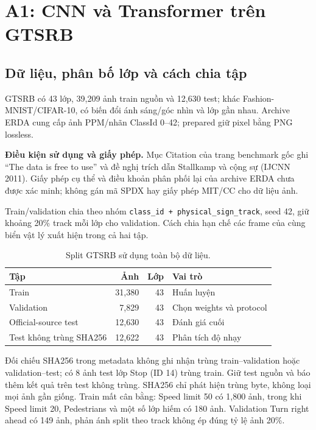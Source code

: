 \chapter{A1: CNN và Transformer trên GTSRB}
\section{Dữ liệu, phân bố lớp và cách chia tập}
GTSRB \cite{gtsrb,gtsrb2011} có 43 lớp, 39,209 ảnh train nguồn và 12,630 test;
khác Fashion-MNIST/CIFAR-10, có biến đổi ánh sáng/góc nhìn và lớp gần nhau.
Archive ERDA \cite{gtsrbarchive} cung cấp ảnh PPM/nhãn ClassId 0--42;
prepared giữ pixel bằng PNG lossless.

\textbf{Điều kiện sử dụng và giấy phép.} Mục Citation của trang benchmark gốc
\cite{gtsrbterms} ghi ``The data is free to use'' và đề nghị trích dẫn
Stallkamp và cộng sự (IJCNN 2011). Giấy phép cụ thể và điều khoản phân phối
lại của archive ERDA chưa được xác minh; không gán mã SPDX hay giấy phép
MIT/CC cho dữ liệu ảnh.

Train/validation chia theo nhóm \texttt{class\_id + physical\_sign\_track},
seed 42, giữ khoảng 20\% track mỗi lớp cho validation. Cách chia hạn chế
các frame của cùng biển vật lý xuất hiện trong cả hai tập.
\begin{table}[H]\centering\caption{Split GTSRB sử dụng toàn bộ dữ liệu.}
\begin{tabular}{lrrl}\toprule Tập & Ảnh & Lớp & Vai trò\\\midrule
Train &31,380&43&Huấn luyện\\
Validation &7,829&43&Chọn weights và protocol\\
Official-source test &12,630&43&Đánh giá cuối\\
Test không trùng SHA256 &12,622&43&Phân tích độ nhạy\\\bottomrule\end{tabular}\label{table:a1-1}
\end{table}
Đối chiếu SHA256 trong metadata không ghi nhận trùng train--validation
hoặc validation--test; có 8 ảnh test lớp Stop (ID 14) trùng train.
Giữ test nguồn và báo thêm kết quả trên test không trùng. SHA256 chỉ
phát hiện trùng byte, không loại mọi ảnh gần giống.
Train mất cân bằng: Speed limit 50 có 1,800 ảnh, trong khi Speed limit 20,
Pedestrians và một số lớp hiếm có 180 ảnh. Validation Turn right ahead
có 149 ảnh, phản ánh split theo track không ép đúng tỷ lệ ảnh 20\%.

